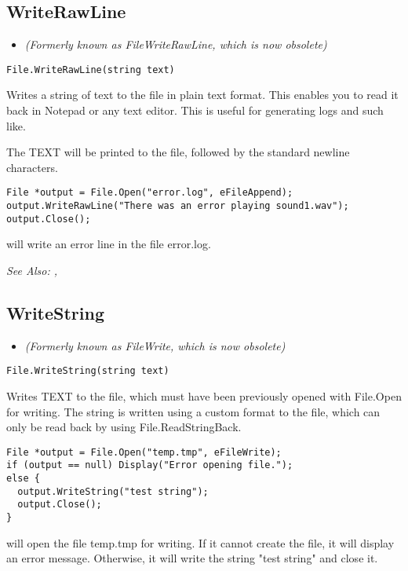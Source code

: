 \subsection{WriteRawLine}\label{File.WriteRawLine}%

\begin{itemize}
\item \it{(Formerly known as FileWriteRawLine, which is now obsolete)}
\end{itemize}

\begin{verbatim}
File.WriteRawLine(string text)
\end{verbatim}
Writes a string of text to the file in plain text format. This enables
you to read it back in Notepad or any text editor. This is useful for generating
logs and such like.

The TEXT will be printed to the file, followed by the standard newline characters.

\begin{verbatim}
File *output = File.Open("error.log", eFileAppend);
output.WriteRawLine("There was an error playing sound1.wav");
output.Close();
\end{verbatim}
will write an error line in the file error.log.

\it{See Also:} ,


\subsection{WriteString}\label{File.WriteString}%

\begin{itemize}
\item \it{(Formerly known as FileWrite, which is now obsolete)}
\end{itemize}

\begin{verbatim}
File.WriteString(string text)
\end{verbatim}
Writes TEXT to the file, which must have been previously opened with
File.Open for writing. The string is written using a custom format to
the file, which can only be read back by using File.ReadStringBack.

\begin{verbatim}
File *output = File.Open("temp.tmp", eFileWrite);
if (output == null) Display("Error opening file.");
else {
  output.WriteString("test string");
  output.Close();
}
\end{verbatim}
will open the file temp.tmp for writing. If it cannot create the file, it will display
an error message. Otherwise, it will write the string "test string" and close it.

